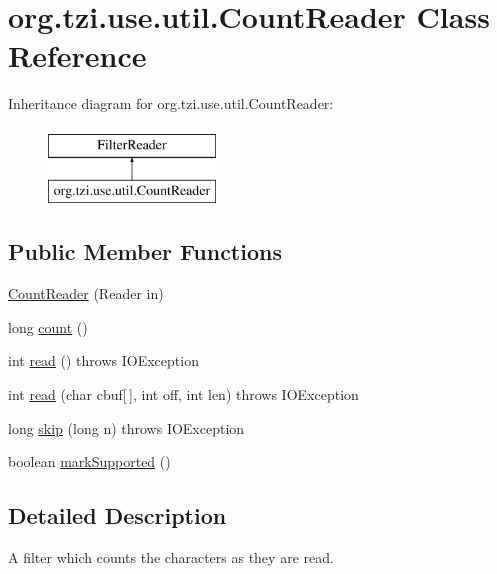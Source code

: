 \hypertarget{classorg_1_1tzi_1_1use_1_1util_1_1_count_reader}{\section{org.\-tzi.\-use.\-util.\-Count\-Reader Class Reference}
\label{classorg_1_1tzi_1_1use_1_1util_1_1_count_reader}
}
Inheritance diagram for org.\-tzi.\-use.\-util.\-Count\-Reader\-:\begin{figure}[H]
\begin{center}
\leavevmode
\includegraphics[height=2.000000cm]{classorg_1_1tzi_1_1use_1_1util_1_1_count_reader}
\end{center}
\end{figure}
\subsection*{Public Member Functions}
\begin{DoxyCompactItemize}
\item 
\hyperlink{classorg_1_1tzi_1_1use_1_1util_1_1_count_reader_a39c28ed4a3a9f8de8531c2d231568f15}{Count\-Reader} (Reader in)
\item 
long \hyperlink{classorg_1_1tzi_1_1use_1_1util_1_1_count_reader_a5e87da5716973cfb73d9da0c311da3ee}{count} ()
\item 
int \hyperlink{classorg_1_1tzi_1_1use_1_1util_1_1_count_reader_a261a02a6d4e8c74364b00d178dfb5c8b}{read} ()  throws I\-O\-Exception 
\item 
int \hyperlink{classorg_1_1tzi_1_1use_1_1util_1_1_count_reader_a06431983add8ca0d11e6b68de8cc10c5}{read} (char cbuf\mbox{[}$\,$\mbox{]}, int off, int len)  throws I\-O\-Exception 
\item 
long \hyperlink{classorg_1_1tzi_1_1use_1_1util_1_1_count_reader_ae70dc8c4abf3a65d7299468cb51643e8}{skip} (long n)  throws I\-O\-Exception 
\item 
boolean \hyperlink{classorg_1_1tzi_1_1use_1_1util_1_1_count_reader_aad0798dc90499408cc177f33e8167c0c}{mark\-Supported} ()
\end{DoxyCompactItemize}


\subsection{Detailed Description}
A filter which counts the characters as they are read.


